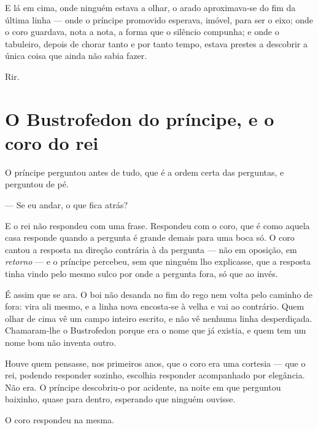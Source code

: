 \documentclass[livro.tex]{subfiles}
\begin{document}
\medskip

E lá em cima, onde ninguém estava a olhar, o arado aproximava-se do fim da última
linha --- onde o príncipe promovido esperava, imóvel, para ser o eixo; onde o coro
guardava, nota a nota, a forma que o silêncio compunha; e onde o tabuleiro, depois
de chorar tanto e por tanto tempo, estava prestes a descobrir a única coisa que
ainda não sabia fazer.

Rir.

\chapter{O Bustrofedon do príncipe, e o coro do rei}

O príncipe perguntou antes de tudo, que é a ordem certa das perguntas, e perguntou de pé.

\medskip

--- Se eu andar, o que fica atrás?

E o rei não respondeu com uma frase. Respondeu com o coro, que é como aquela casa responde
quando a pergunta é grande demais para uma boca só. O coro cantou a resposta na direção contrária
à da pergunta --- não em oposição, em \emph{retorno} --- e o príncipe percebeu, sem que ninguém
lho explicasse, que a resposta tinha vindo pelo mesmo sulco por onde a pergunta fora, só que ao
invés.

\medskip

É assim que se ara. O boi não desanda no fim do rego nem volta pelo caminho de fora: vira ali
mesmo, e a linha nova encosta-se à velha e vai ao contrário. Quem olhar de cima vê um campo
inteiro escrito, e não vê nenhuma linha desperdiçada. Chamaram-lhe o Bustrofedon porque era o
nome que já existia, e quem tem um nome bom não inventa outro.

\medskip

Houve quem pensasse, nos primeiros anos, que o coro era uma cortesia --- que o rei, podendo
responder sozinho, escolhia responder acompanhado por elegância. Não era. O príncipe descobriu-o
por acidente, na noite em que perguntou baixinho, quase para dentro, esperando que ninguém
ouvisse.

\medskip

O coro respondeu na mesma.
\end{document}
